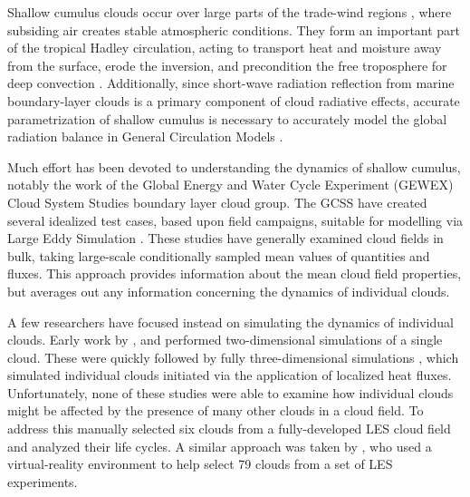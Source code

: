 \documentclass[acp]{copernicus}
\begin{document}

\introduction

Shallow cumulus clouds occur over large parts of the trade-wind regions 
\citep{Norris1988}, where subsiding air creates stable atmospheric conditions.  
They form an important part of the tropical Hadley circulation, acting to 
transport heat and moisture away from the surface, erode the inversion, and 
precondition the free troposphere for deep convection \citep{Tiedtke1988, 
Neggers2007}.  Additionally, since short-wave radiation reflection from marine 
boundary-layer clouds is a primary component of cloud radiative effects, 
accurate parametrization of shallow cumulus is necessary to accurately model 
the global radiation balance in General Circulation Models 
\citep[GCMs;][]{Bony2005, Medeiros2008, Wyant2009, Medeiros2011}.
  
Much effort has been devoted to understanding the dynamics of shallow cumulus, 
notably the work of the Global Energy and Water Cycle Experiment (GEWEX) Cloud 
System Studies \citep[GCSS;][]{Randall2003} boundary layer cloud group.  The 
GCSS have created several idealized test cases, based upon field campaigns, 
suitable for modelling via Large Eddy Simulation \citep[LES;][]{Siebesma1995, 
Stevens2001, Brown2002, vanZanten2011}.  These studies have 
generally examined cloud fields in bulk, taking large-scale conditionally 
sampled mean values of quantities and fluxes.  This approach provides 
information about the mean cloud field properties, but averages out any 
information concerning the dynamics of individual clouds.

A few researchers have focused instead on simulating the dynamics of individual
clouds. Early work by \cite{Klaassen1985}, \cite{Bretherton1989} and 
\cite{Grabowski1991} performed two-dimensional simulations of a single 
cloud.  These were quickly followed by fully three-dimensional simulations 
\citep{Grabowski1993, Grabowski1993a, Carpenter1998, Blyth2005}, which 
simulated individual clouds initiated via the application of localized heat 
fluxes.  Unfortunately, none of these studies were able to examine how 
individual clouds might be affected by the presence of many other clouds in a 
cloud field.  To address this \cite{Zhao2005, Zhao2005a} manually selected six 
clouds from a fully-developed LES cloud field and analyzed their life cycles.  
A similar approach was taken by \cite{Heus2009}, who used a virtual-reality 
environment to help select 79 clouds from a set of LES experiments.
\end{document}
